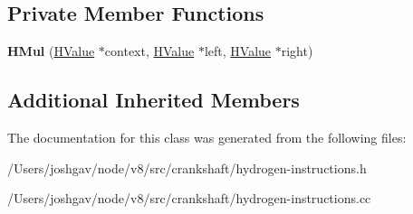\subsection*{Private Member Functions}
\begin{DoxyCompactItemize}
\item 
{\bfseries H\+Mul} (\hyperlink{classv8_1_1internal_1_1_h_value}{H\+Value} $\ast$context, \hyperlink{classv8_1_1internal_1_1_h_value}{H\+Value} $\ast$left, \hyperlink{classv8_1_1internal_1_1_h_value}{H\+Value} $\ast$right)\hypertarget{classv8_1_1internal_1_1_h_mul_a8c61babf6fbb622292c18eb9c069c819}{}\label{classv8_1_1internal_1_1_h_mul_a8c61babf6fbb622292c18eb9c069c819}

\end{DoxyCompactItemize}
\subsection*{Additional Inherited Members}


The documentation for this class was generated from the following files\+:\begin{DoxyCompactItemize}
\item 
/\+Users/joshgav/node/v8/src/crankshaft/hydrogen-\/instructions.\+h\item 
/\+Users/joshgav/node/v8/src/crankshaft/hydrogen-\/instructions.\+cc\end{DoxyCompactItemize}
